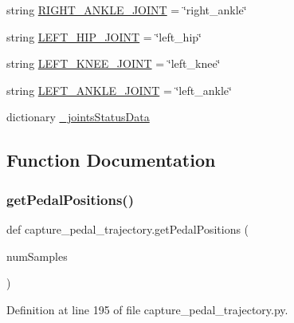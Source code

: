 \begin{DoxyCompactItemize}
\item 
string \mbox{\hyperlink{namespacecapture__pedal__trajectory_aeaa979292407a578df6b6ed8088b908d}{R\+I\+G\+H\+T\+\_\+\+A\+N\+K\+L\+E\+\_\+\+J\+O\+I\+NT}} = \char`\"{}right\+\_\+ankle\char`\"{}
\item 
string \mbox{\hyperlink{namespacecapture__pedal__trajectory_ae837fb7d509f64b8c35bad991e20eb06}{L\+E\+F\+T\+\_\+\+H\+I\+P\+\_\+\+J\+O\+I\+NT}} = \char`\"{}left\+\_\+hip\char`\"{}
\item 
string \mbox{\hyperlink{namespacecapture__pedal__trajectory_a4ac7e5482c7632b894bddac8c4e4c314}{L\+E\+F\+T\+\_\+\+K\+N\+E\+E\+\_\+\+J\+O\+I\+NT}} = \char`\"{}left\+\_\+knee\char`\"{}
\item 
string \mbox{\hyperlink{namespacecapture__pedal__trajectory_a498ea7bdb7ff782e4c26e38ec4c119c7}{L\+E\+F\+T\+\_\+\+A\+N\+K\+L\+E\+\_\+\+J\+O\+I\+NT}} = \char`\"{}left\+\_\+ankle\char`\"{}
\item 
dictionary \mbox{\hyperlink{namespacecapture__pedal__trajectory_a240d770bc46f43f1b4e5591bf959fd9b}{\+\_\+joints\+Status\+Data}}
\end{DoxyCompactItemize}


\subsection{Function Documentation}
\mbox{\label{namespacecapture__pedal__trajectory_a73fc41de533fbb350b426e9c08886203}} 
\subsubsection{\texorpdfstring{getPedalPositions()}{getPedalPositions()}}
{\footnotesize\ttfamily def capture\+\_\+pedal\+\_\+trajectory.\+get\+Pedal\+Positions (\begin{DoxyParamCaption}\item[{}]{num\+Samples }\end{DoxyParamCaption})}



Definition at line 195 of file capture\+\_\+pedal\+\_\+trajectory.\+py.



